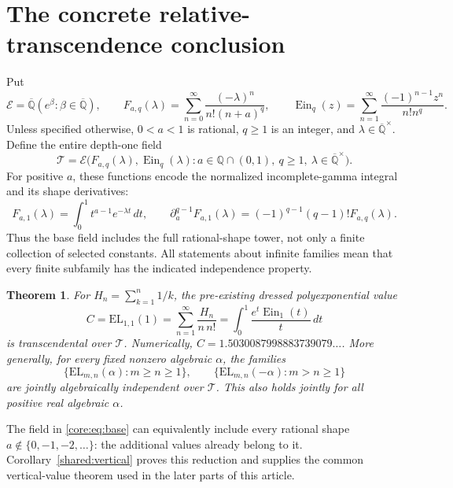 \documentclass[11pt,a4paper]{article}
\newcommand{\Qbar}{\overline{\mathbb Q}}
\newcommand{\E}{\mathcal E}
\newcommand{\T}{\mathcal T}
\newcommand{\EL}{\mathrm{EL}}
\DeclareMathOperator{\Ein}{Ein}
\newtheorem{theorem}{Theorem}[section]
\theoremstyle{definition}
\theoremstyle{remark}
\numberwithin{equation}{section}
\begin{document}
\section{The concrete relative-transcendence conclusion}
Put
\[
 \E=\Qbar(e^\beta:\beta\in\Qbar),\qquad
 F_{a,q}(\lambda)=\sum_{n=0}^{\infty}
       \frac{(-\lambda)^n}{n!(n+a)^q},\qquad
 \Ein_q(z)=\sum_{n=1}^{\infty}
       \frac{(-1)^{n-1}z^n}{n!n^q}.
\]
Unless specified otherwise, $0<a<1$ is rational, $q\ge1$ is an integer,
and $\lambda\in\Qbar^\times$. Define the entire depth-one field
\begin{equation}
 \T=\E\bigl(F_{a,q}(\lambda),\Ein_q(\lambda):
 a\in\mathbb Q\cap(0,1),\ q\ge1,\ \lambda\in\Qbar^\times\bigr).
 \label{core:eq:base}
\end{equation}
For positive $a$, these functions encode the normalized incomplete-gamma
integral and its shape derivatives:
\[
 F_{a,1}(\lambda)=\int_0^1t^{a-1}e^{-\lambda t}\,dt,
 \qquad
 \partial_a^{q-1}F_{a,1}(\lambda)
   =(-1)^{q-1}(q-1)!F_{a,q}(\lambda).
\]
Thus the base field includes the full rational-shape tower, not only
a finite collection of selected constants.
All statements about infinite families mean that every finite subfamily
has the indicated independence property.

\begin{theorem}\label{core:thm:concrete}
For $H_n=\sum_{k=1}^n1/k$, the pre-existing dressed polyexponential value
\begin{equation}
 C=\EL_{1,1}(1)=\sum_{n=1}^{\infty}\frac{H_n}{n\,n!}
   =\int_0^1\frac{e^t\Ein_1(t)}{t}\,dt
 \label{core:eq:C}
\end{equation}
is transcendental over $\T$. Numerically, $C=1.5030087998883739079\ldots$.
More generally, for every fixed nonzero algebraic $\alpha$, the families
\begin{equation}
 \{\EL_{m,n}(\alpha):m\ge n\ge1\},\qquad
 \{\EL_{m,n}(-\alpha):m>n\ge1\}
 \label{core:eq:depthtwo}
\end{equation}
are jointly algebraically independent over $\T$.
This also holds jointly for all positive real algebraic $\alpha$.
\end{theorem}

The field in \eqref{core:eq:base} can equivalently include every rational shape
$a\notin\{0,-1,-2,\ldots\}$: the additional values already belong to it.
Corollary~\ref{shared:vertical} proves this reduction and supplies the
common vertical-value theorem used in the later parts of this article.
\end{document}
